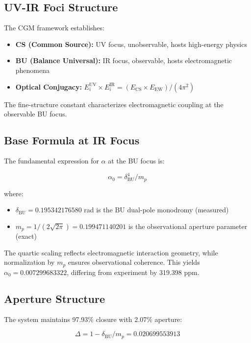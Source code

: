 \documentclass[11pt,a4paper]{article}
\theoremstyle{definition}
\theoremstyle{remark}
\begin{document}
\subsection{UV-IR Foci Structure}

The CGM framework establishes:
\begin{itemize}
\item \textbf{CS (Common Source):} UV focus, unobservable, hosts high-energy physics
\item \textbf{BU (Balance Universal):} IR focus, observable, hosts electromagnetic phenomena
\item \textbf{Optical Conjugacy:} $E_i^{\mathrm{UV}} \times E_i^{\mathrm{IR}} = (E_{\mathrm{CS}} \times E_{\mathrm{EW}})/(4\pi^2)$
\end{itemize}

The fine-structure constant characterizes electromagnetic coupling at the observable BU focus.

\subsection{Base Formula at IR Focus}

The fundamental expression for $\alpha$ at the BU focus is:

\begin{equation}
\alpha_0 = \delta_{\mathrm{BU}}^4 / m_p \tag{1}
\end{equation}

where:
\begin{itemize}
\item $\delta_{\mathrm{BU}} = 0.195342176580$ rad is the BU dual-pole monodromy (measured)
\item $m_p = 1/(2\sqrt{2\pi}) = 0.199471140201$ is the observational aperture parameter (exact)
\end{itemize}

The quartic scaling reflects electromagnetic interaction geometry, while normalization by $m_p$ ensures observational coherence. This yields $\alpha_0 = 0.007299683322$, differing from experiment by 319.398 ppm.

\subsection{Aperture Structure}

The system maintains 97.93\% closure with 2.07\% aperture:

\begin{equation}
\Delta = 1 - \delta_{\mathrm{BU}}/m_p = 0.020699553913 \tag{2}
\end{equation}
\end{document}
